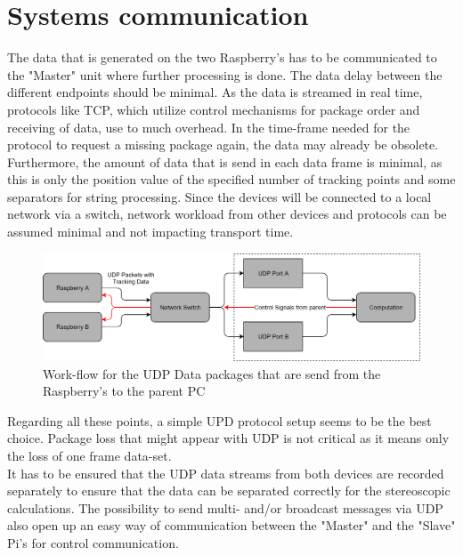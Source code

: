 \section{Systems communication}
The data that is generated on the two Raspberry's has to be communicated to the "Master" unit where further processing is done. The data delay between the different endpoints should be minimal. As the data is streamed in real time, protocols like TCP, which utilize control mechanisms for package order and receiving of data, use to much overhead. In the time-frame needed for the protocol to request a missing package again, the data may already be obsolete. \\Furthermore, the amount of data that is send in each data frame is minimal, as this is only the position value of the specified number of tracking points and some separators for string processing. Since the devices will be connected to a local network via a switch, network workload from other devices and protocols can be assumed minimal and not impacting transport time.\\
\begin{figure}[H]
\includegraphics[width=\textwidth]{images/Network_Diagram.png}
\caption{Work-flow for the UDP Data packages that are send from the Raspberry's to the parent PC}
\label{img:netzwerk_diagram} 
\end{figure}
Regarding all these points, a simple UPD protocol setup seems to be the best choice. Package loss that might appear with UDP is not critical as it means only the loss of one frame data-set.\\
It has to be ensured that the UDP data streams from both devices are recorded separately to ensure that the data can be separated correctly for the stereoscopic calculations.
The possibility to send multi- and/or broadcast messages via UDP also open up an easy way of communication between the "Master" and the "Slave" Pi's for control communication.
\newpage
